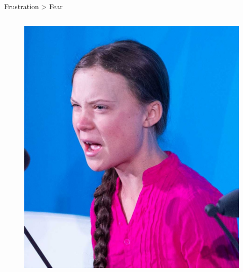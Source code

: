 \documentclass{beamer}
\begin{document}
\begin{frame}{Frustration >  Fear}

\begin{columns}
\begin{figure}
\includegraphics[width=1.02\textwidth,height=1.02\textheight,keepaspectratio]{Figures/Greta.jpg}
\end{figure}



\end{columns}
\end{frame}
\end{document}
